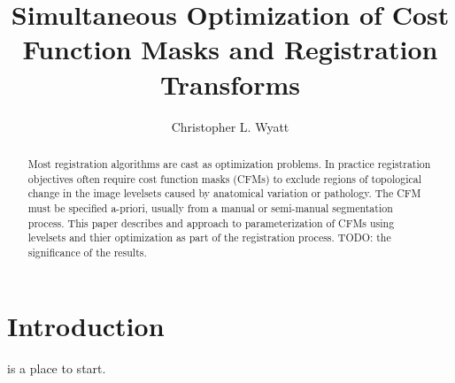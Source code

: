 \documentclass[]{article}
\title{Simultaneous Optimization of Cost Function Masks and
  Registration Transforms}
\author{Christopher L. Wyatt}
\begin{document}
\maketitle

\begin{abstract}
  Most registration algorithms are cast as optimization problems. In
  practice registration objectives often require cost function masks
  (CFMs) to exclude regions of topological change in the image
  levelsets caused by anatomical variation or pathology. The CFM must
  be specified a-priori, usually from a manual or semi-manual
  segmentation process. This paper describes and approach to
  parameterization of CFMs using levelsets and thier optimization as
  part of the registration process. TODO: the significance of the
  results.
\end{abstract}

\section{Introduction}
\cite{Crum2003} is a place to start.
\end{document}
